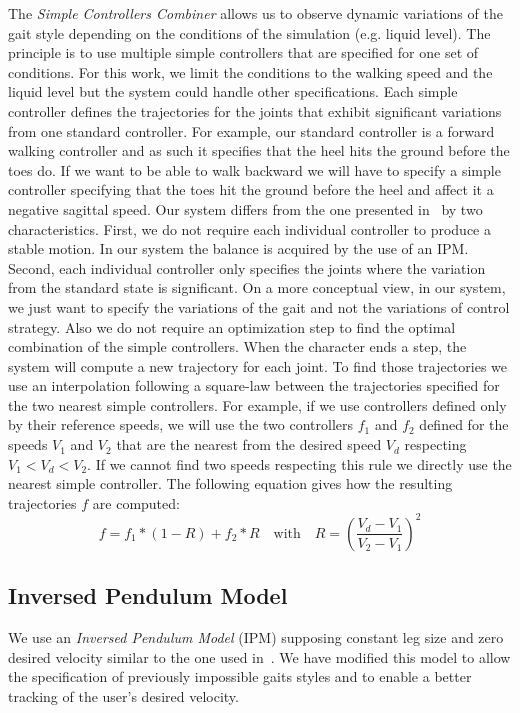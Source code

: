 \documentclass[conference]{acmsiggraph}
\begin{document}
The \textit{Simple Controllers Combiner} allows us to observe dynamic variations of the gait style depending on the conditions of the simulation (e.g. liquid level). The principle is to use multiple simple controllers that are specified for one set of conditions. For this work, we limit the conditions to the walking speed and the liquid level but the system could handle other specifications. Each simple controller defines the trajectories for the joints that exhibit significant variations from one standard controller. For example, our standard controller is a forward walking controller and as such it specifies that the heel hits the ground before the toes do. If we want to be able to walk backward we will have to specify a simple controller specifying that the toes hit the ground before the heel and affect it a negative sagittal speed. Our system differs from the one presented in~\cite{coros2009robust} by two characteristics. First, we do not require each individual controller to produce a stable motion. In our system the balance is acquired by the use of an IPM. Second, each individual controller only specifies the joints where the variation from the standard state is significant. On a more conceptual view, in our system, we just want to specify the variations of the gait and not the variations of control strategy. Also we do not require an optimization step to find the optimal combination of the simple controllers. When the character ends a step, the system will compute a new trajectory for each joint. To find those trajectories we use an interpolation following a square-law between the trajectories specified for the two nearest simple controllers. For example, if we use controllers defined only by their reference speeds, we will use the two controllers $f_1$ and $f_2$ defined for the speeds $V_1$ and $V_2$ that are the nearest from the desired speed $V_d$ respecting $V_1 < V_d < V_2$. If we cannot find two speeds respecting this rule we directly use the nearest simple controller. The following equation gives how the resulting trajectories $f$ are computed:
$$
f=f_1*(1-R)+f_2*R   \quad \textrm{with} \quad   R=\left( \frac{V_d-V_1}{V_2-V_1} \right) ^2
$$

\subsection{Inversed Pendulum Model}
\label{sec:IPM}

We use an \textit{Inversed Pendulum Model} (IPM) supposing constant leg size and zero desired velocity similar to the one used in~\cite{coros2010generalized}. We have modified this model to allow the specification of previously impossible gaits styles and to enable a better tracking of the user's desired velocity. 
\end{document}
